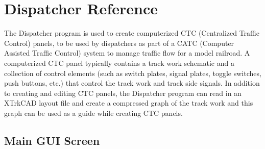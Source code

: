 

\chapter{Dispatcher Reference}
\label{chpt:dispatcher:Reference}

The Dispatcher program is used to create computerized CTC (Centralized
Traffic Control) panels, to be used by dispatchers as part of a CATC
(Computer Assisted Traffic Control) system to manage traffic flow for a
model railroad.  A computerized CTC panel typically contains a track work
schematic and a collection of control elements (such as switch plates,
signal plates, toggle switches, push buttons, etc.) that control the
track work and track side signals.  In addition to creating and editing
CTC panels, the Dispatcher program can read in an XTrkCAD layout file
and create a compressed graph of the track work and this graph can be
used as a guide while creating CTC panels.

\section{Main GUI Screen}

